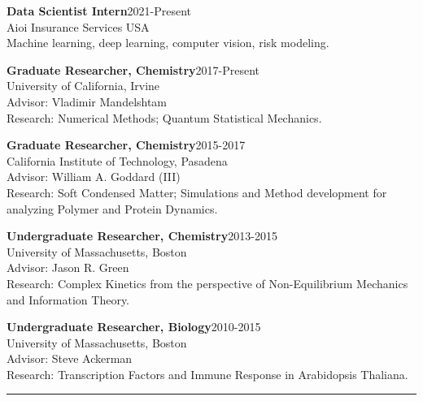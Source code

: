 \documentclass[letterpaper]{article}
\renewenvironment{itemize}{
  \begin{list}{}{
    \setlength{\leftmargin}{1.5em}
  }
}{
  \end{list}
}
\begin{document}
\begin{itemize}

\item \textbf{Data Scientist Intern}\hfill 2021-Present\\
      Aioi Insurance Services USA\\
      Machine learning, deep learning, computer vision, risk modeling. 

\item \textbf{Graduate Researcher, Chemistry}\hfill 2017-Present\\
      University of California, Irvine\\
      Advisor: Vladimir Mandelshtam\\
      Research: Numerical Methods; Quantum Statistical Mechanics.

\item \textbf{Graduate Researcher, Chemistry}\hfill 2015-2017\\
      California Institute of Technology, Pasadena\\
      Advisor: William A. Goddard (III) \\
      Research: Soft Condensed Matter; Simulations and Method development for analyzing
      Polymer and Protein Dynamics.

\item \textbf{Undergraduate Researcher, Chemistry}\hfill 2013-2015\\
      University of Massachusetts, Boston\\
      Advisor: Jason R. Green\\
      Research: Complex Kinetics from the perspective of
      Non-Equilibrium Mechanics and Information Theory.

\item \textbf{Undergraduate Researcher, Biology}\hfill 2010-2015\\
      University of Massachusetts, Boston\\
      Advisor: Steve Ackerman \\
      Research: Transcription Factors and Immune Response in Arabidopsis Thaliana.
\end{itemize}

\vspace{0.1in}
\hrule
\end{document}
